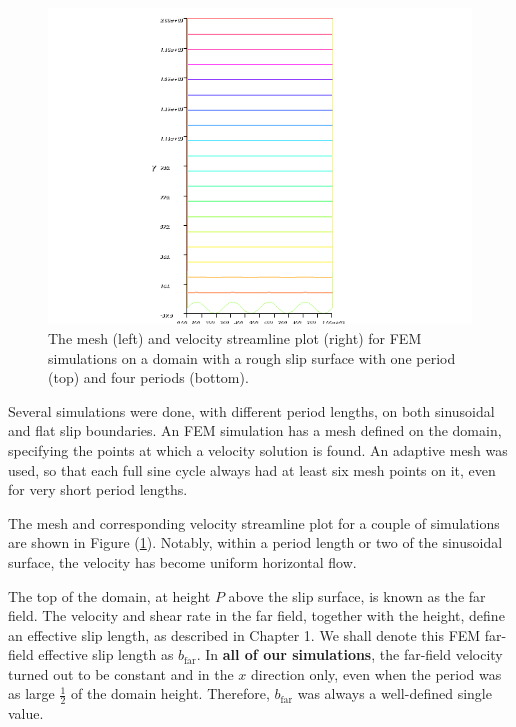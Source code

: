 \documentclass[12pt, a4paper, twoside, openright]{book}
\newcommand{\bfar}{\ensuremath{b_{\mathrm{far}}}}
\begin{document}
\begin{figure}[ht]
\begin{center}
\includegraphics[scale=0.5, trim=4cm 0cm 4cm 0cm, clip=true]{FEM_streamlines_4.png}
\end{center}

\caption{The mesh (left) and velocity streamline plot (right) for FEM simulations on a domain with a rough slip surface with one period (top) and four periods (bottom).}
\label{FEMmesh4}
\end{figure}

\clearpage

Several simulations were done, with different period lengths, on both sinusoidal and flat slip boundaries.  An FEM simulation has a mesh defined on the domain, specifying the points at which a velocity solution is found.  An adaptive mesh was used, so that each full sine cycle always had at least six mesh points on it, even for very short period lengths.

The mesh and corresponding velocity streamline plot for a couple of simulations are shown in Figure (\ref{FEMmesh4}).  Notably, within a period length or two of the sinusoidal surface, the velocity has become uniform horizontal flow.

\vspace{1em}
The top of the domain, at height $P$ above the slip surface, is known as the far field.  The velocity and shear rate in the far field, together with the height, define an effective slip length, as described in Chapter 1.  We shall denote this FEM far-field effective slip length as $\bfar$.  In \textbf{all of our simulations}, the far-field velocity turned out to be constant and in the $x$ direction only, even when the period was as large $\frac{1}{2}$ of the domain height.  Therefore, $\bfar$ was always a well-defined single value.
\end{document}
